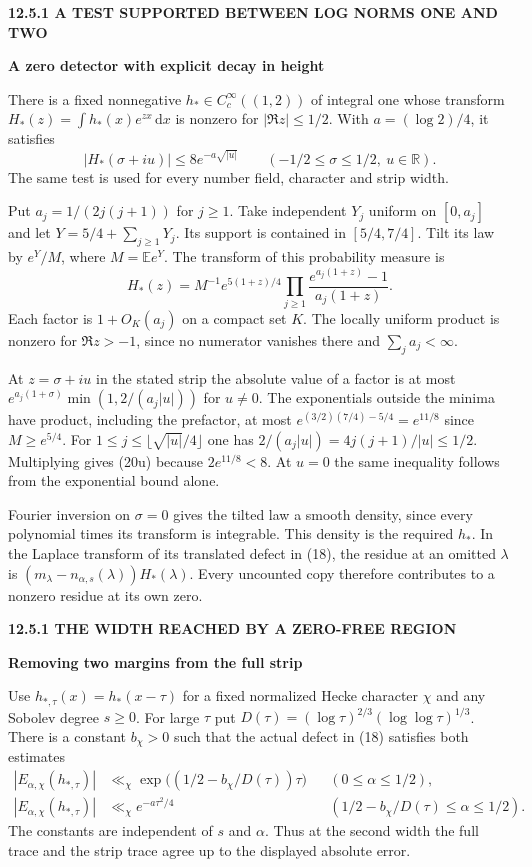 \documentclass[11pt,letterpaper]{article}
\newcommand{\rightmarktext}{}
\newcommand{\printfolio}{}
\newcommand{\leaf}[4]{\clearpage\gdef\printfolio{#1}\gdef\rightmarktext{#2}%
  {\small\sffamily\bfseries\color{ink}#3\par}\vspace{3pt}%
  {\LARGE\bfseries #4\par}\vspace{5pt}}
\newcommand{\R}{\mathbb R}
\newcommand{\dd}{\,\mathrm d}
\begin{document}
\leaf{520o}{A fixed test for the defect}{12.5.1 \quad A TEST SUPPORTED BETWEEN LOG NORMS ONE AND TWO}{A zero detector with explicit decay in height}
There is a fixed nonnegative $h_*\in C_c^\infty((1,2))$ of integral
one whose transform $H_*(z)=\int h_*(x)e^{zx}\dd x$ is nonzero for
$|\Re z|\le1/2$. With $a=(\log 2)/4$, it satisfies
\[
 |H_*(\sigma+iu)|\le 8e^{-a\sqrt{|u|}}
       \qquad (-1/2\le\sigma\le1/2,\ u\in\R).
 \tag{20u}
\]
The same test is used for every number field, character and strip width.

Put $a_j=1/(2j(j+1))$ for $j\ge1$. Take independent $Y_j$ uniform on
$[0,a_j]$ and let $Y=5/4+\sum_{j\ge1}Y_j$. Its support is contained
in $[5/4,7/4]$. Tilt its law by $e^Y/M$, where $M=\mathbb E e^Y$.
The transform of this probability measure is
\[
 H_*(z)=M^{-1}e^{5(1+z)/4}
           \prod_{j\ge1}\frac{e^{a_j(1+z)}-1}{a_j(1+z)} .
\]
Each factor is $1+O_K(a_j)$ on a compact set $K$. The locally uniform
product is nonzero for $\Re z>-1$, since no numerator vanishes there
and $\sum_j a_j<\infty$.

At $z=\sigma+iu$ in the stated strip the absolute value of a factor is
at most $e^{a_j(1+\sigma)}\min(1,2/(a_j|u|))$ for $u\ne0$. The
exponentials outside the minima have product, including the prefactor,
at most $e^{(3/2)(7/4)-5/4}=e^{11/8}$ since $M\ge e^{5/4}$.
For $1\le j\le\lfloor\sqrt{|u|}/4\rfloor$ one has
$2/(a_j|u|)=4j(j+1)/|u|\le1/2$. Multiplying gives (20u) because
$2e^{11/8}<8$. At $u=0$ the same inequality follows from the
exponential bound alone.

Fourier inversion on $\sigma=0$ gives the tilted law a smooth
density, since every polynomial times its transform is integrable.
This density is the required $h_*$. In the Laplace transform of its
translated defect in (18), the residue at an omitted $\lambda$ is
$(m_\lambda-n_{\alpha,s}(\lambda))H_*(\lambda)$. Every uncounted
copy therefore contributes to a nonzero residue at its own zero.

\leaf{520p}{Bounds for the trace defect}{12.5.1 \quad THE WIDTH REACHED BY A ZERO-FREE REGION}{Removing two margins from the full strip}
Use $h_{*,\tau}(x)=h_*(x-\tau)$ for a fixed normalized Hecke
character $\chi$ and any Sobolev degree $s\ge0$. For large $\tau$ put
$D(\tau)=(\log\tau)^{2/3}(\log\log\tau)^{1/3}$.
There is a constant $b_\chi>0$ such that the actual defect in (18)
satisfies both estimates
\begin{align*}
 |E_{\alpha,\chi}(h_{*,\tau})|
   &\ll_\chi \exp\big((1/2-b_\chi/D(\tau))\tau\big)
                              &&(0\le\alpha\le1/2),\\
 |E_{\alpha,\chi}(h_{*,\tau})|
   &\ll_\chi e^{-a\tau^2/4}
            &&(1/2-b_\chi/D(\tau)\le\alpha\le1/2).
 \tag{20v}
\end{align*}
The constants are independent of $s$ and $\alpha$. Thus at the
second width the full trace and the strip trace agree up to the
displayed absolute error.
\end{document}
